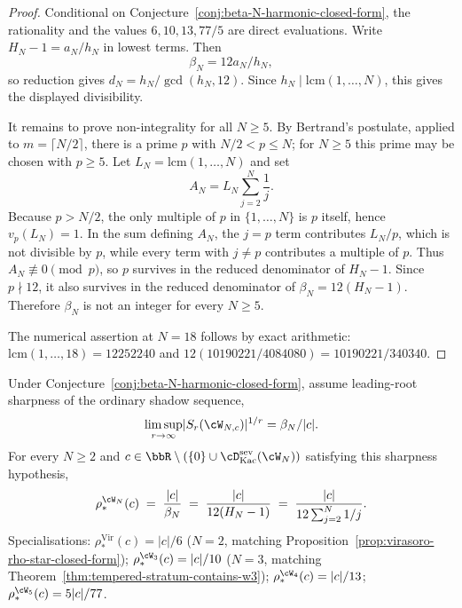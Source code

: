 \begin{proof}
Conditional on Conjecture~\ref{conj:beta-N-harmonic-closed-form},
the rationality and the values $6,10,13,77/5$ are direct evaluations.
Write $H_N-1=a_N/h_N$ in lowest terms.  Then
\[
 \beta_N=12a_N/h_N,
\]
so reduction gives
$d_N=h_N/\gcd(h_N,12)$.  Since
$h_N\mid \mathrm{lcm}(1,\ldots,N)$, this gives the displayed
divisibility.

It remains to prove non-integrality for all $N\geq 5$.  By Bertrand's
postulate, applied to $m=\lceil N/2\rceil$, there is a prime $p$ with
$N/2<p\leq N$; for $N\geq 5$ this prime may be chosen with $p\geq 5$.
Let $L_N=\mathrm{lcm}(1,\ldots,N)$ and set
\[
 A_N=L_N\sum_{j=2}^{N}\frac1j.
\]
Because $p>N/2$, the only multiple of $p$ in $\{1,\ldots,N\}$ is $p$
itself, hence $v_p(L_N)=1$.  In the sum defining $A_N$, the $j=p$
term contributes $L_N/p$, which is not divisible by $p$, while every
term with $j\neq p$ contributes a multiple of $p$.  Thus
$A_N\not\equiv 0\pmod p$, so $p$ survives in the reduced denominator
of $H_N-1$.  Since $p\nmid 12$, it also survives in the reduced
denominator of $\beta_N=12(H_N-1)$.  Therefore $\beta_N$ is not an
integer for every $N\geq 5$.

The numerical assertion at $N=18$ follows by exact arithmetic:
$\mathrm{lcm}(1,\ldots,18)=12252240$ and
$12(10190221/4084080)=10190221/340340$.
\end{proof}

\begin{proposition}
\label{prop:rho-star-WN-closed-form-upgrade}
\ClaimStatusConditional
Under Conjecture~\ref{conj:beta-N-harmonic-closed-form}, assume
leading-root sharpness of the ordinary shadow sequence,
\[
 \limsup_{r \to \infty} \lvert S_r(\cW_{N,c}) \rvert^{1/r}
 =
 \beta_N/\lvert c\rvert .
\]
For every $N \ge 2$ and $c \in \bbR \setminus (\{0\} \cup
\cD^{\mathrm{sev}}_{\mathrm{Kac}}(\cW_N))$ satisfying this sharpness
hypothesis,
\[
 \rho_*^{\cW_N}(c)
 \;=\;
 \frac{\lvert c \rvert}{\beta_N}
 \;=\;
 \frac{\lvert c \rvert}{12 (H_N - 1)}
 \;=\;
 \frac{\lvert c \rvert}{12 \sum_{j = 2}^{N} 1/j}.
\]
Specialisations:
$\rho_*^{\mathrm{Vir}}(c) = |c|/6$ ($N=2$, matching
Proposition~\ref{prop:virasoro-rho-star-closed-form});
$\rho_*^{\cW_3}(c) = |c|/10$ ($N=3$, matching
Theorem~\ref{thm:tempered-stratum-contains-w3});
$\rho_*^{\cW_4}(c) = |c|/13$;
$\rho_*^{\cW_5}(c) = 5|c|/77$.
\end{proposition}

